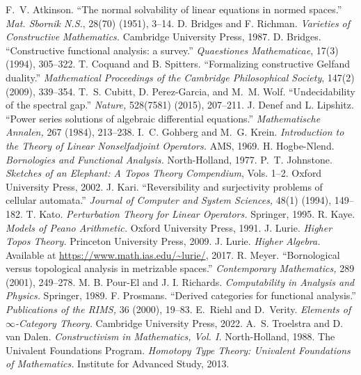 \documentclass[11pt]{article}
\theoremstyle{definition}
\begin{document}


\begin{thebibliography}{99}
F.~V. Atkinson. ``The normal solvability of linear equations in normed spaces.'' \emph{Mat. Sbornik N.S.}, 28(70) (1951), 3--14.
D. Bridges and F. Richman. \emph{Varieties of Constructive Mathematics.} Cambridge University Press, 1987.
D. Bridges. ``Constructive functional analysis: a survey.'' \emph{Quaestiones Mathematicae}, 17(3) (1994), 305--322.
T. Coquand and B. Spitters. ``Formalizing constructive Gelfand duality.'' \emph{Mathematical Proceedings of the Cambridge Philosophical Society}, 147(2) (2009), 339--354.
T.~S. Cubitt, D. Perez-Garcia, and M.~M. Wolf. ``Undecidability of the spectral gap.'' \emph{Nature,} 528(7581) (2015), 207--211.
J. Denef and L. Lipshitz. ``Power series solutions of algebraic differential equations.'' \emph{Mathematische Annalen,} 267 (1984), 213--238.
I.~C. Gohberg and M.~G. Krein. \emph{Introduction to the Theory of Linear Nonselfadjoint Operators.} AMS, 1969.
H. Hogbe-Nlend. \emph{Bornologies and Functional Analysis.} North-Holland, 1977.
P.~T. Johnstone. \emph{Sketches of an Elephant: A Topos Theory Compendium}, Vols. 1--2. Oxford University Press, 2002.
J. Kari. ``Reversibility and surjectivity problems of cellular automata.'' \emph{Journal of Computer and System Sciences,} 48(1) (1994), 149--182.
T. Kato. \emph{Perturbation Theory for Linear Operators.} Springer, 1995.
R. Kaye. \emph{Models of Peano Arithmetic.} Oxford University Press, 1991.
J. Lurie. \emph{Higher Topos Theory.} Princeton University Press, 2009.
J. Lurie. \emph{Higher Algebra.} Available at \url{https://www.math.ias.edu/~lurie/}, 2017.
R. Meyer. ``Bornological versus topological analysis in metrizable spaces.'' \emph{Contemporary Mathematics,} 289 (2001), 249--278.
M. B. Pour-El and J. I. Richards. \emph{Computability in Analysis and Physics.} Springer, 1989.
F. Prosmans. ``Derived categories for functional analysis.'' \emph{Publications of the RIMS,} 36 (2000), 19--83.
E.~Riehl and D.~Verity. \emph{Elements of $\infty$-Category Theory.}
Cambridge University Press, 2022.
A.~S. Troelstra and D. van Dalen. \emph{Constructivism in Mathematics, Vol. I.} North-Holland, 1988.
The Univalent Foundations Program. \emph{Homotopy Type Theory: Univalent Foundations of Mathematics.} Institute for Advanced Study, 2013.


\end{thebibliography}
\end{document}
